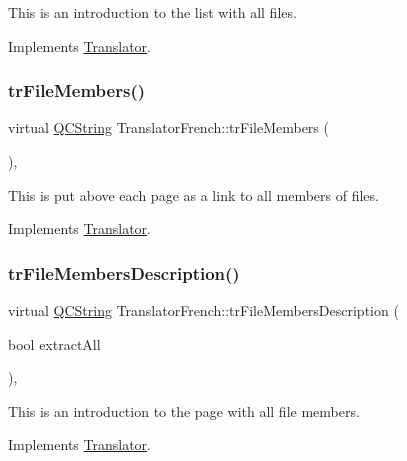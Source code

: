 This is an introduction to the list with all files. 

Implements \mbox{\hyperlink{class_translator}{Translator}}.

\mbox{\label{class_translator_french_a0c174bcf8e15b19aeff4a72409a312fb}} 
\subsubsection{\texorpdfstring{trFileMembers()}{trFileMembers()}}
{\footnotesize\ttfamily virtual \mbox{\hyperlink{class_q_c_string}{Q\+C\+String}} Translator\+French\+::tr\+File\+Members (\begin{DoxyParamCaption}{ }\end{DoxyParamCaption})\hspace{0.3cm}{\ttfamily [inline]}, {\ttfamily [virtual]}}

This is put above each page as a link to all members of files. 

Implements \mbox{\hyperlink{class_translator}{Translator}}.

\mbox{\label{class_translator_french_a97f7745302572a9c662c80cfd280c5fa}} 
\subsubsection{\texorpdfstring{trFileMembersDescription()}{trFileMembersDescription()}}
{\footnotesize\ttfamily virtual \mbox{\hyperlink{class_q_c_string}{Q\+C\+String}} Translator\+French\+::tr\+File\+Members\+Description (\begin{DoxyParamCaption}\item[{bool}]{extract\+All }\end{DoxyParamCaption})\hspace{0.3cm}{\ttfamily [inline]}, {\ttfamily [virtual]}}

This is an introduction to the page with all file members. 

Implements \mbox{\hyperlink{class_translator}{Translator}}.

\mbox{\label{class_translator_french_af1beb79a395737cc590b7053b82a60bf}} 
